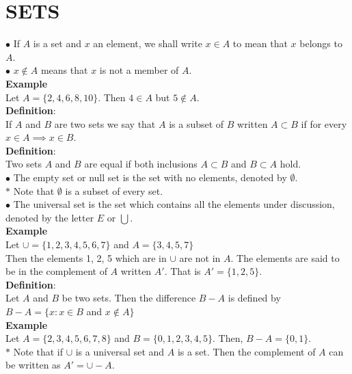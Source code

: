 \documentclass[11pt,a4paper]{article}
\begin{document}
\tableofcontents
\thispagestyle{empty}
\clearpage




\setcounter{page}{1}


\section{SETS}
$\bullet$ If $A$ is a set  and $x$ an element, we shall write $x\in A$ to mean that $x$ belongs to $A$.\\
$\bullet$ $x\not\in A$ means that $x$ is not a member of $A$.\\

\textbf{Example}\\ Let $A=\{2,4,6,8,10\}$. Then $4\in A$ but $5\not\in A$.\\


\textbf{Definition}:\\ If $A$ and $B$ are two sets we say that $A$ is a subset of $B$ written $A\subset B$ if for every\\ $x\in A\implies x\in B$.\\

\textbf{Definition}:\\ Two sets $A$ and $B$ are equal if both inclusions $A\subset B$ and $B\subset A$ hold.\\
$\bullet$ The empty set or null set is the set with no elements, denoted by $\emptyset$.\\
$*$  Note that $\emptyset$ is a subset of every set.\\
$\bullet$ The universal set is the set which contains all the elements under discussion, denoted by the letter $E$ or $\bigcup$.\\


\textbf{Example}\\ Let $\cup =\{1,2,3,4,5,6,7\}$ and $A=\{3,4,5,7\}$\\ Then the elements 1, 2, 5 which are in $\cup$  are not in $A$. The elements are said to be in the complement of $A$ written $A'$. That is $A'=\{1,2,5\}$.\\

\textbf{Definition}:\\ Let $A$ and $B$ be two sets. Then the difference $B-A$ is defined by $B-A=\{x:x\in B$ and $x\not\in A\}$\\

\textbf{Example}\\ Let $A=\{2,3,4,5,6,7,8\}$ and $B=\{0,1,2,3,4,5\}$. Then, $B-A=\{0,1\}$.\\
$*$ Note that  if $\cup$ is a universal set and $A$ is a set. Then the complement of $A$ can be written as $A'=\cup - A$.\\\\
\end{document}
